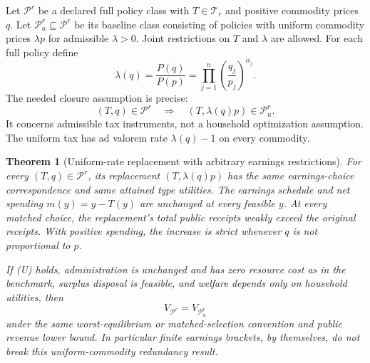 \documentclass[11pt]{article}
\newtheorem{theorem}{Theorem}
\theoremstyle{definition}
\begin{document}
Let $\mathcal P^r$ be a declared full policy class with $T\in\mathcal T_r$
and positive commodity prices $q$. Let
$\mathcal P_u^r\subseteq\mathcal P^r$ be its baseline class consisting
of policies with uniform commodity prices $\lambda p$ for admissible
$\lambda>0$. Joint restrictions on $T$ and $\lambda$ are allowed.
For each full policy define
\[
 \lambda(q)=\frac{P(q)}{P(p)}
       =\prod_{j=1}^n\left(\frac{q_j}{p_j}\right)^{\alpha_j}.
\]
The needed closure assumption is precise:
\[
 (T,q)\in\mathcal P^r
 \quad\Longrightarrow\quad
 (T,\lambda(q)p)\in\mathcal P_u^r.                 \tag{U}
\]
It concerns admissible tax instruments, not a household optimization
assumption. The uniform tax has ad valorem rate $\lambda(q)-1$ on
every commodity.

\begin{theorem}[Uniform-rate replacement with arbitrary earnings restrictions]
For every $(T,q)\in\mathcal P^r$, its replacement
$(T,\lambda(q)p)$ has the same earnings-choice correspondence and
same attained type utilities. The earnings schedule and net spending
$m(y)=y-T(y)$ are unchanged at every feasible $y$. At every matched
choice, the replacement's total public receipts weakly exceed the
original receipts. With positive spending, the increase is strict
whenever $q$ is not proportional to $p$.

If (U) holds, administration is unchanged and has zero resource cost as
in the benchmark, surplus disposal is feasible, and welfare depends
only on household utilities, then
\[
 V_{\mathcal P^r}=V_{\mathcal P_u^r}
\]
under the same worst-equilibrium or matched-selection convention and
public revenue lower bound. In particular finite earnings brackets,
by themselves, do not break this uniform-commodity redundancy result.
\end{theorem}
\end{document}
